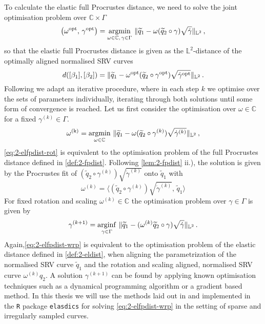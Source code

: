 \noindent To calculate the elastic full Procrustes distance, we need to solve the joint optimisation problem over $\mathbb{C} \times \Gamma$
\begin{equation}
  \label{eq:2-elfpdist-opt}
  \left(\omega^\text{opt},\, \gamma^\text{opt} \right) = \operatorname*{argmin}_{\omega \in \mathbb{C},\, \gamma \in \Gamma} \,\, \lVert\widetilde q_1 - \omega (\widetilde q_2 \circ \gamma) \sqrt{\dot\gamma}\rVert_{\mathbb{L}^2}\,,
\end{equation}
so that the elastic full Procrustes distance is given as the $\mathbb{L}^2$-distance of the optimally aligned normalised SRV curves
\begin{equation}
  d([\beta_1], [\beta_2]) = \lVert\widetilde q_1 - \omega^\text{opt} ( \widetilde q_2 \circ \gamma^\text{opt}) \sqrt{\dot\gamma^\text{opt}}\rVert_{\mathbb{L}^2}\,.
\end{equation}
Following \cite{SrivastavaEtAl2011} we adapt an iterative procedure, where in each step $k$ we optimise over the sets of parameters individually, iterating through both solutions until some form of convergence is reached.
Let us first consider the optimisation over $\omega \in \mathbb{C}$ for a fixed $\gamma^{(k)} \in \Gamma$.
\begin{equation}
  \label{eq:2-elfpdist-rot}
  \omega^\text{(k)}= \operatorname*{argmin}_{\omega \in \mathbb{C}}\,\, \lVert\widetilde q_1 - \omega (\widetilde q_2 \circ \gamma^{(k)}) \sqrt{\dot{\gamma}^{(k)}}\rVert_{\mathbb{L}^2}\,,
\end{equation}
\cref{eq:2-elfpdist-rot} is equivalent to the optimisation problem of the full Procrustes distance defined in \cref{def:2-fpdist}.
Following \cref{lem:2-fpdist} ii.), the solution is given by the Procrustes fit of $(\widetilde q_2 \circ \gamma^{(k)}) \sqrt{\dot\gamma^{(k)}}$ onto $\widetilde q_1$ with 
\begin{equation}
  \label{eq:2-elfpdist-rot-opt}
  \omega^{(k)} =\langle (\widetilde q_2 \circ \gamma^{(k)}) \sqrt{\dot\gamma^{(k)}},\, \widetilde q_1 \rangle
\end{equation}
For fixed rotation and scaling $\omega^{(k)} \in \mathbb{C}$ the optimisation problem over $\gamma \in \Gamma$ is given by 
\begin{equation}
  \label{eq:2-elfpdist-wrp}
  \gamma^{(k+1)} = \operatorname*{arginf}_{\gamma \in \Gamma}\,\, \lVert\widetilde q_1 - (\omega^{(k)} \widetilde q_2 \circ \gamma) \sqrt{\dot\gamma}\rVert_{\mathbb{L}^2}\,.
\end{equation}
Again,\cref{eq:2-elfpdist-wrp} is equivalent to the optimisation problem of the elastic distance defined in \cref{def:2-eldist}, when aligning the parametrization of the normalised SRV curve $\widetilde q_1$ and the rotation and scaling aligned, normalised SRV curve $\omega^{(k)} q_2$.
A solution $\gamma^{(k+1)}$ can be found by applying known optimisation techniques such as a dynamical programming algorithm or a gradient based method.
In this thesis we will use the methods laid out in \cite{Steyer2021} and implemented in the \texttt{R} package \texttt{elasdics} \parencite{elasdics} for solving \cref{eq:2-elfpdist-wrp} in the setting of sparse and irregularly sampled curves.

